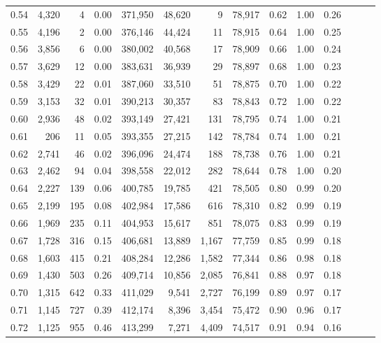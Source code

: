 \begin{tabular}{rrrrrrrrrrrrrr}
0.54 &  4,320 &      4 &  0.00 &  371,950 &   48,620 &       9 &  78,917 &  0.62 &  1.00 &      0.26 \\
0.55 &  4,196 &      2 &  0.00 &  376,146 &   44,424 &      11 &  78,915 &  0.64 &  1.00 &      0.25 \\
0.56 &  3,856 &      6 &  0.00 &  380,002 &   40,568 &      17 &  78,909 &  0.66 &  1.00 &      0.24 \\
0.57 &  3,629 &     12 &  0.00 &  383,631 &   36,939 &      29 &  78,897 &  0.68 &  1.00 &      0.23 \\
0.58 &  3,429 &     22 &  0.01 &  387,060 &   33,510 &      51 &  78,875 &  0.70 &  1.00 &      0.22 \\
0.59 &  3,153 &     32 &  0.01 &  390,213 &   30,357 &      83 &  78,843 &  0.72 &  1.00 &      0.22 \\
0.60 &  2,936 &     48 &  0.02 &  393,149 &   27,421 &     131 &  78,795 &  0.74 &  1.00 &      0.21 \\
0.61 &    206 &     11 &  0.05 &  393,355 &   27,215 &     142 &  78,784 &  0.74 &  1.00 &      0.21 \\
0.62 &  2,741 &     46 &  0.02 &  396,096 &   24,474 &     188 &  78,738 &  0.76 &  1.00 &      0.21 \\
0.63 &  2,462 &     94 &  0.04 &  398,558 &   22,012 &     282 &  78,644 &  0.78 &  1.00 &      0.20 \\
0.64 &  2,227 &    139 &  0.06 &  400,785 &   19,785 &     421 &  78,505 &  0.80 &  0.99 &      0.20 \\
0.65 &  2,199 &    195 &  0.08 &  402,984 &   17,586 &     616 &  78,310 &  0.82 &  0.99 &      0.19 \\
0.66 &  1,969 &    235 &  0.11 &  404,953 &   15,617 &     851 &  78,075 &  0.83 &  0.99 &      0.19 \\
0.67 &  1,728 &    316 &  0.15 &  406,681 &   13,889 &   1,167 &  77,759 &  0.85 &  0.99 &      0.18 \\
0.68 &  1,603 &    415 &  0.21 &  408,284 &   12,286 &   1,582 &  77,344 &  0.86 &  0.98 &      0.18 \\
0.69 &  1,430 &    503 &  0.26 &  409,714 &   10,856 &   2,085 &  76,841 &  0.88 &  0.97 &      0.18 \\
0.70 &  1,315 &    642 &  0.33 &  411,029 &    9,541 &   2,727 &  76,199 &  0.89 &  0.97 &      0.17 \\
0.71 &  1,145 &    727 &  0.39 &  412,174 &    8,396 &   3,454 &  75,472 &  0.90 &  0.96 &      0.17 \\
0.72 &  1,125 &    955 &  0.46 &  413,299 &    7,271 &   4,409 &  74,517 &  0.91 &  0.94 &      0.16 \\

\end{tabular}
